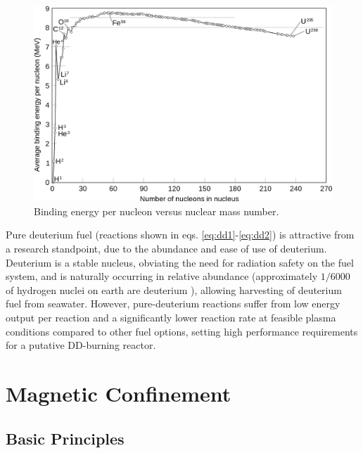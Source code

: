 \begin{figure}
 \includegraphics[width=0.65\fullwidth]{graphics/Introduction/bindingenergy.png}
 \caption{Binding energy per nucleon versus nuclear mass number.}
 \label{fig:bindingenergy}
\end{figure}

Pure deuterium fuel (reactions shown in eqs. \ref{eq:dd1}-\ref{eq:dd2}) is attractive from a research standpoint, due to the abundance and ease of use of deuterium.  Deuterium is a stable nucleus, obviating the need for radiation safety on the fuel system, and is naturally occurring in relative abundance (approximately $1/6000$ of hydrogen nuclei on earth are deuterium ), allowing harvesting of deuterium fuel from seawater.  However, pure-deuterium reactions suffer from low energy output per reaction  and a significantly lower reaction rate at feasible plasma conditions compared to other fuel options, setting high performance requirements for a putative DD-burning reactor.




\section{Magnetic Confinement}\label{sec:intro_magnetic}

\subsection{Basic Principles}\label{subsec:intro_basic}

